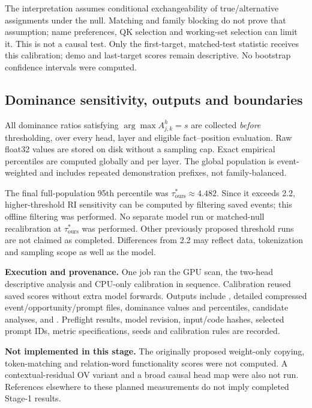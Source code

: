 The interpretation assumes conditional exchangeability of true/alternative assignments under the null. Matching and family blocking do not prove that assumption; name preferences, QK selection and working-set selection can limit it. This is not a causal test. Only the first-target, matched-test statistic receives this calibration; demo and last-target scores remain descriptive. No bootstrap confidence intervals were computed.

\subsection{Dominance sensitivity, outputs and boundaries}
All dominance ratios satisfying $\arg\max A^h_{j,k}=s$ are collected \emph{before} thresholding, over every head, layer and eligible fact--position evaluation. Raw float32 values are stored on disk without a sampling cap. Exact empirical percentiles are computed globally and per layer. The global population is event-weighted and includes repeated demonstration prefixes, not family-balanced.

The final full-population 95th percentile was $\tau^*_{\mathrm{ours}}\approx4.482$. Since it exceeds 2.2, higher-threshold RI sensitivity can be computed by filtering saved events; this offline filtering was performed. No separate model run or matched-null recalibration at $\tau^*_{\mathrm{ours}}$ was performed. Other previously proposed threshold runs are not claimed as completed. Differences from 2.2 may reflect data, tokenization and sampling scope as well as the model.

\textbf{Execution and provenance.} One job ran the GPU scan, the two-head descriptive analysis and CPU-only calibration in sequence. Calibration reused saved scores without extra model forwards. Outputs include , detailed compressed event/opportunity/prompt files, dominance values and percentiles, candidate analyses, and . Preflight results, model revision, input/code hashes, selected prompt IDs, metric specifications, seeds and calibration rules are recorded.

\textbf{Not implemented in this stage.} The originally proposed weight-only copying, token-matching and relation-word functionality scores were not computed. A contextual-residual OV variant and a broad causal head map were also not run. References elsewhere to these planned measurements do not imply completed Stage-1 results.

